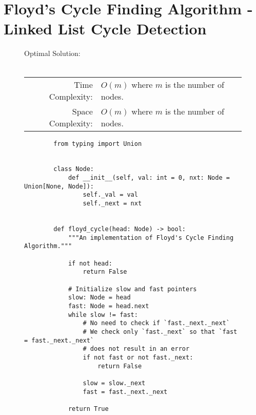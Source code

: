 
\section{Floyd's Cycle Finding Algorithm - Linked List Cycle Detection}

\begin{figure}[H]
    Optimal Solution:\\\\
    \begin{tabular}{rl}
        Time Complexity:& \(O(m)\) where \(m\) is the number of nodes.\\
        Space Complexity:& \(O(m)\) where \(m\) is the number of nodes.
    \end{tabular}
\end{figure}

\begin{figure}[H]
    \centering
    \begin{verbatim}
        from typing import Union


        class Node:
            def __init__(self, val: int = 0, nxt: Node = Union[None, Node]):
                self._val = val
                self._next = nxt


        def floyd_cycle(head: Node) -> bool:
            """An implementation of Floyd's Cycle Finding Algorithm."""

            if not head:
                return False

            # Initialize slow and fast pointers
            slow: Node = head
            fast: Node = head.next
            while slow != fast:
                # No need to check if `fast._next._next`
                # We check only `fast._next` so that `fast = fast._next._next`
                # does not result in an error
                if not fast or not fast._next:
                    return False

                slow = slow._next
                fast = fast._next._next

            return True
    \end{verbatim}
\end{figure}
